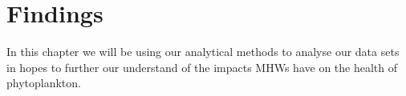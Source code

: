 \chapter{Findings}

In this chapter we will be using our analytical methods to analyse our data sets in hopes to further our understand of the impacts MHWs have on the health of phytoplankton.





